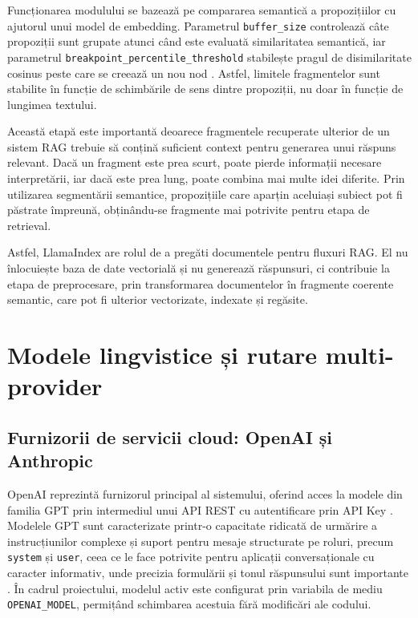 \documentclass[12pt, a4paper, oneside, romanian]{teza-upb}
\begin{document}
Funcționarea modulului se bazează pe compararea semantică a propozițiilor cu ajutorul unui model de embedding. Parametrul \texttt{buffer\_size} controlează câte propoziții sunt grupate atunci când este evaluată similaritatea semantică, iar parametrul \texttt{breakpoint\_percentile\_threshold} stabilește pragul de disimilaritate cosinus peste care se creează un nou nod \cite{llamaindex_semantic_splitter}. Astfel, limitele fragmentelor sunt stabilite în funcție de schimbările de sens dintre propoziții, nu doar în funcție de lungimea textului.

Această etapă este importantă deoarece fragmentele recuperate ulterior de un sistem RAG trebuie să conțină suficient context pentru generarea unui răspuns relevant. Dacă un fragment este prea scurt, poate pierde informații necesare interpretării, iar dacă este prea lung, poate combina mai multe idei diferite. Prin utilizarea segmentării semantice, propozițiile care aparțin aceluiași subiect pot fi păstrate împreună, obținându-se fragmente mai potrivite pentru etapa de retrieval.

Astfel, LlamaIndex are rolul de a pregăti documentele pentru fluxuri RAG. El nu înlocuiește baza de date vectorială și nu generează răspunsuri, ci contribuie la etapa de preprocesare, prin transformarea documentelor în fragmente coerente semantic, care pot fi ulterior vectorizate, indexate și regăsite.


\section{Modele lingvistice și rutare multi-provider}


\subsection{Furnizorii de servicii cloud: OpenAI și Anthropic}

OpenAI reprezintă furnizorul principal al sistemului, oferind acces la modele 
din familia GPT prin intermediul unui API REST cu autentificare prin API Key
\cite{openai_api}. Modelele GPT sunt caracterizate printr-o capacitate ridicată 
de urmărire a instrucțiunilor complexe și suport pentru mesaje structurate pe roluri, precum \texttt{system} și \texttt{user}, ceea ce le face potrivite pentru aplicații conversaționale cu caracter informativ, unde precizia formulării și tonul răspunsului sunt importante 
\cite{openai_api}. În cadrul proiectului, modelul activ este configurat prin 
variabila de mediu \texttt{OPENAI\_MODEL}, permițând schimbarea acestuia fără 
modificări ale codului.
\end{document}

